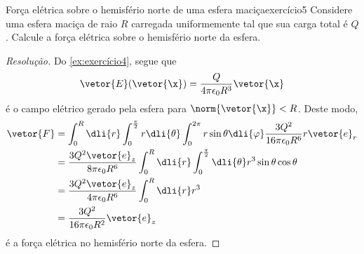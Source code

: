 \begin{exercício}{Força elétrica sobre o hemisfério norte de uma esfera maciça}{exercício5}
    Considere uma esfera maciça de raio \(R\) carregada uniformemente tal que sua carga total é \(Q\). Calcule a força elétrica sobre o hemisfério norte da esfera.
\end{exercício}
\begin{proof}[Resolução]
    Do \cref{ex:exercício4}, segue que
    \begin{equation*}
        \vetor{E}(\vetor{\x}) = \frac{Q}{4\pi \epsilon_0 R^3}\vetor{\x}
    \end{equation*}
    é o campo elétrico gerado pela esfera para \(\norm{\vetor{\x}} < R\). Deste modo,
    \begin{align*}
        \vetor{F} &= \int_0^R\dli{r} \int_0^\frac{\pi}{2} r\dli{\theta} \int_0^{2\pi} r\sin\theta \dli{\varphi} \frac{3Q^2}{16\pi \epsilon_0 R^6}r\vetor{e}_r\\
                  &= \frac{3Q^2 \vetor{e}_z}{8\pi \epsilon_0 R^6} \int_0^R\dli{r}\int_{0}^{\frac{\pi}{2}}\dli{\theta} r^3 \sin\theta \cos\theta\\
                  &= \frac{3Q^2 \vetor{e}_z}{4\pi \epsilon_0 R^6} \int_0^R\dli{r} r^3\\
                  &= \frac{3Q^2}{16\pi \epsilon_0 R^2} \vetor{e}_z
    \end{align*}
    é a força elétrica no hemisfério norte da esfera.
\end{proof}
